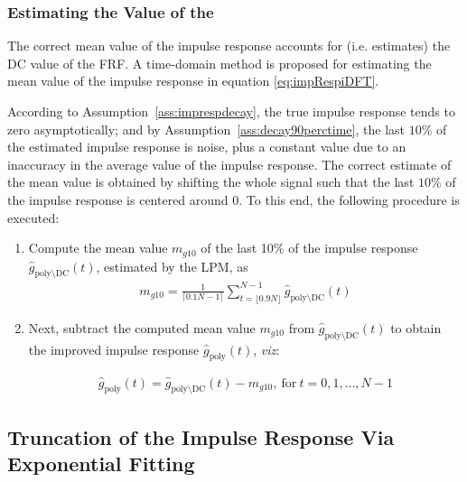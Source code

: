 \subsubsection{Estimating the  Value of the }\label{se:DCvalueEst}



The correct mean value of the impulse response accounts for (i.e. estimates) the \gls{DC} value of the \gls{FRF}. A time-domain method is proposed for estimating the mean value of the impulse response in equation \eqref{eq:impRespiDFT}. %

According to Assumption~\ref{ass:imprespdecay}, the true impulse response tends to zero asymptotically; and by Assumption~\ref{ass:decay90perctime}, the last $10\%$ of the estimated impulse response is noise, plus a constant value due to an inaccuracy in the average value of the impulse response. The correct estimate of the mean value is obtained by shifting the whole signal such that the last $10\%$ of the impulse response is centered around 0.
To this end, the following procedure is executed:


\begin{enumerate}
\item Compute the mean value $m_{g10}$ of the last 10\% of the impulse response $\hat g_{\mathrm{poly}\setminus \mathrm{DC
}}(t)$, estimated by the \gls{LPM}, as %
\begin{align}
m_{g10} = \frac{1}{\lceil0.1N - 1\rceil}\sum_{t=\lfloor0.9N\rfloor}^{N-1}\hat g_{\mathrm{poly}\setminus \mathrm{DC
}}(t)
\end{align}

\item Next, subtract the computed mean value $m_{g10}$ from $\hat g_{\mathrm{poly}\setminus \mathrm{DC
}}(t)$ to obtain the improved impulse response $\hat g_\mathrm{poly}(t)$, \emph{viz}:


\begin{align}
\hat g_\mathrm{poly}(t) = \hat g_{\mathrm{poly}\setminus \mathrm{DC
}}(t) - m_{g10},\ \text{for}\ t=0,1,\dots,N-1
\end{align}


\end{enumerate}

\subsection{Truncation of the Impulse Response Via Exponential Fitting}\label{se:truncImpulseResp}

